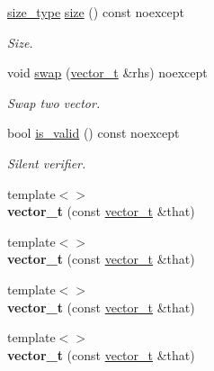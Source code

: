 \begin{DoxyCompactItemize}
\hyperlink{classatom_1_1vector__t_a1790d79321f4fa8d2580474dd0f56033}{size\+\_\+type} \hyperlink{classatom_1_1vector__t_ad81b85532451986356b3b244aa1b77e7}{size} () const noexcept
\begin{DoxyCompactList}\small\item\em Size. \end{DoxyCompactList}\item 
void \hyperlink{classatom_1_1vector__t_a37462493cd88e3c610cc0004b9bb0b57}{swap} (\hyperlink{classatom_1_1vector__t}{vector\+\_\+t} \&rhs) noexcept
\begin{DoxyCompactList}\small\item\em Swap two vector. \end{DoxyCompactList}\item 
bool \hyperlink{classatom_1_1vector__t_a16a4c8f9d44c9878affca542eba877d3}{is\+\_\+valid} () const noexcept
\begin{DoxyCompactList}\small\item\em Silent verifier. \end{DoxyCompactList}\item 
\mbox{\label{classatom_1_1vector__t_a08ad6fbf9240e4d85ee8c428afa98f35}} 
{\footnotesize template$<$$>$ }\\{\bfseries vector\+\_\+t} (const \hyperlink{classatom_1_1vector__t}{vector\+\_\+t} \&that)
\item 
\mbox{\label{classatom_1_1vector__t_a8a2ca85d8037a099eddc04c3b8be9a8a}} 
{\footnotesize template$<$$>$ }\\{\bfseries vector\+\_\+t} (const \hyperlink{classatom_1_1vector__t}{vector\+\_\+t} \&that)
\item 
\mbox{\label{classatom_1_1vector__t_a8eaf8a26ed2e914992248ff3f5aff058}} 
{\footnotesize template$<$$>$ }\\{\bfseries vector\+\_\+t} (const \hyperlink{classatom_1_1vector__t}{vector\+\_\+t} \&that)
\item 
\mbox{\label{classatom_1_1vector__t_af4351b624d6c6fd6d4d3e0d56cc0c070}} 
{\footnotesize template$<$$>$ }\\{\bfseries vector\+\_\+t} (const \hyperlink{classatom_1_1vector__t}{vector\+\_\+t} \&that)
\item 
\mbox{\label{classatom_1_1vector__t_abf74131a0e0b83a5afcf6641b0619851}} 

\end{DoxyCompactItemize}
